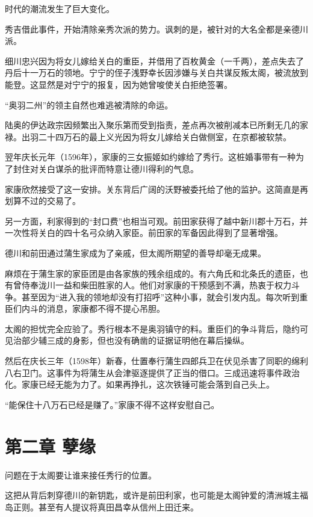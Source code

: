 \documentclass[
]{book}
\begin{document}
时代的潮流发生了巨大变化。

秀吉借此事件，开始清除亲秀次派的势力。讽刺的是，被针对的大名全都是亲德川派。

细川忠兴因为将女儿嫁给关白的重臣，并借用了百枚黄金（一千两），差点失去了丹后十一万石的领地。宁宁的侄子浅野幸长因涉嫌与关白共谋反叛太阁，被流放到能登。这显然是对宁宁的报复，因为她曾唆使关白拒绝签署。

``奥羽二州''的领主自然也难逃被清除的命运。

陆奥的伊达政宗因频繁出入聚乐第而受到指责，差点再次被削减本已所剩无几的家禄。出羽二十四万石的最上义光因为将女儿嫁给关白做侧室，在京都被软禁。

翌年庆长元年（1596年），家康的三女振姬如约嫁给了秀行。这桩婚事带有一种为了封住对关白谋杀的批评而特意让德川得利的气息。

家康欣然接受了这一安排。关东背后广阔的沃野被委托给了他的监护。这简直是再划算不过的交易了。

另一方面，利家得到的``封口费''也相当可观。前田家获得了越中新川郡十万石，并一次性将关白的四十名弓众纳入家臣。前田家的军备因此得到了显著增强。

德川和前田通过蒲生家成为了亲戚，但太阁所期望的善导却毫无成果。

麻烦在于蒲生家的家臣团是由各家族的残余组成的。有六角氏和北条氏的遗臣，也有曾侍奉泷川一益和柴田胜家的人。他们对家康的干预感到不满，热衷于权力斗争。甚至因为``进入我的领地却没有打招呼''这种小事，就会引发内乱。每次听到重臣们内斗的消息，家康都不得不提心吊胆。

太阁的担忧完全应验了。秀行根本不是奥羽镇守的料。重臣们的争斗背后，隐约可见治部少辅三成的身影，但也没有确凿的证据证明他在幕后操纵。

然后在庆长三年（1598年）新春，仕置奉行蒲生四郎兵卫在伏见杀害了同职的绵利八右卫门。这事件为将蒲生从会津驱逐提供了正当的借口。三成迅速将事件政治化。家康已经无能为力了。如果再挣扎，这次铁锤可能会落到自己头上。

``能保住十八万石已经是赚了。''家康不得不这样安慰自己。

\chapter*{第二章 孽缘}\label{ux7b2cux4e8cux7ae0-ux5b7dux7f18}

问题在于太阁要让谁来接任秀行的位置。

这把从背后刺穿德川的新钥匙，或许是前田利家，也可能是太阁钟爱的清洲城主福岛正则。甚至有人提议将真田昌幸从信州上田迁来。
\end{document}
